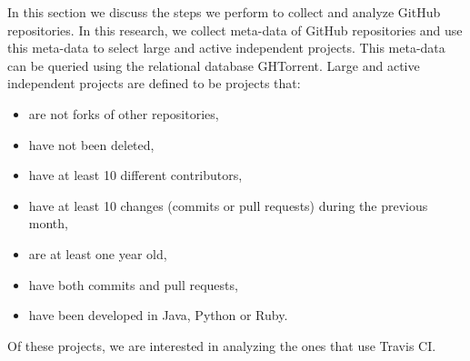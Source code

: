 In this section we discuss the steps we perform to collect and analyze GitHub repositories.
In this research, we collect meta-data of GitHub repositories and use this meta-data to select large and active independent projects.
This meta-data can be queried using the relational database GHTorrent. \cite{ghtorrent}
Large and active independent projects are defined to be projects that:
\begin{itemize}
\item are not forks of other repositories,
\item have not been deleted,
\item have at least 10 different contributors,
\item have at least 10 changes (commits or pull requests) during the previous month,
\item are at least one year old,
\item have both commits and pull requests,
\item have been developed in Java, Python or Ruby.
\end{itemize}
Of these projects, we are interested in analyzing the ones that use Travis CI.